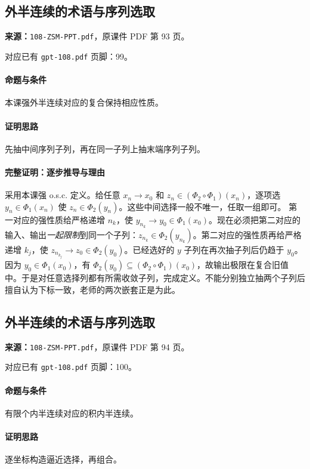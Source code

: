 \clearpage\subsection{外半连续的术语与序列选取}
\textbf{来源：}\texttt{108-ZSM-PPT.pdf}，原课件 PDF 第 93 页。\par
对应已有 \texttt{gpt-108.pdf} 页脚：99。\par
\paragraph{命题与条件}本课强外半连续对应的复合保持相应性质。
\paragraph{证明思路}先抽中间序列子列，再在同一子列上抽末端序列子列。
\paragraph{完整证明：逐步推导与理由}

采用本课强 o.s.c. 定义。给任意 $x_n\to x_0$ 和 $z_n\in(\Phi_2\circ\Phi_1)(x_n)$，逐项选 $y_n\in\Phi_1(x_n)$ 使 $z_n\in\Phi_2(y_n)$。这些中间选择一般不唯一，任取一组即可。
第一对应的强性质给严格递增 $n_k$，使 $y_{n_k}\to y_0\in\Phi_1(x_0)$。现在必须把第二对应的输入、输出\emph{一起限制}到同一个子列：$z_{n_k}\in\Phi_2(y_{n_k})$。第二对应的强性质再给严格递增 $k_j$，使 $z_{n_{k_j}}\to z_0\in\Phi_2(y_0)$。已经选好的 $y$ 子列在再次抽子列后仍趋于 $y_0$。
因为 $y_0\in\Phi_1(x_0)$，有 $\Phi_2(y_0)\subseteq(\Phi_2\circ\Phi_1)(x_0)$，故输出极限在复合旧值中。于是对任意选择列都有所需收敛子列，完成定义。不能分别独立抽两个子列后擅自认为下标一致，老师的两次嵌套正是为此。

\clearpage\subsection{外半连续的术语与序列选取}
\textbf{来源：}\texttt{108-ZSM-PPT.pdf}，原课件 PDF 第 94 页。\par
对应已有 \texttt{gpt-108.pdf} 页脚：100。\par
\paragraph{命题与条件}有限个内半连续对应的积内半连续。
\paragraph{证明思路}逐坐标构造逼近选择，再组合。
